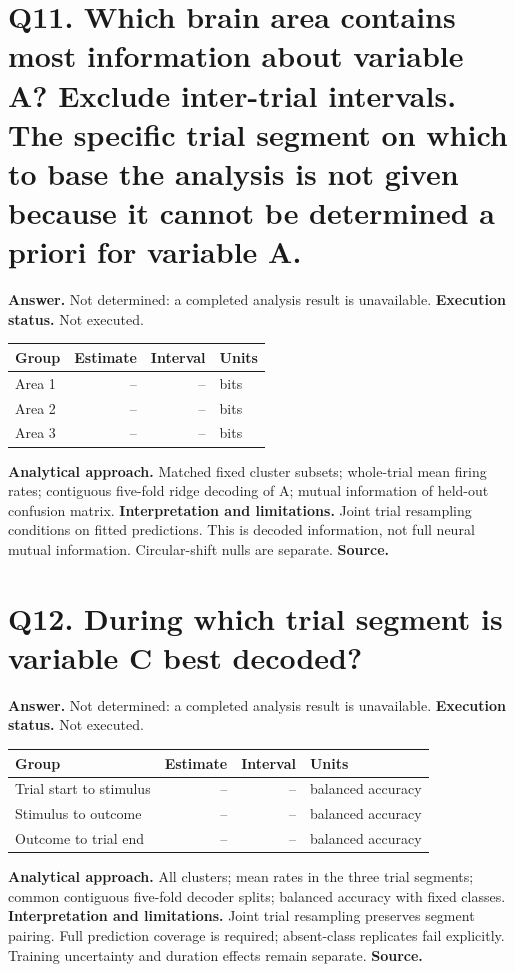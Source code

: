 \documentclass[11pt,a4paper]{article}
\begin{document}
\section*{Q11. Which brain area contains most information about variable A? Exclude inter-trial intervals. The specific trial segment on which to base the analysis is not given because it cannot be determined a priori for variable A.}
\textbf{Answer.} Not determined: a completed analysis result is unavailable.
\textbf{Execution status.} Not executed.
\begin{tabularx}{\linewidth}{XrrX}\toprule Group & Estimate & Interval & Units \\\midrule
Area 1 & -- & -- & bits \\
Area 2 & -- & -- & bits \\
Area 3 & -- & -- & bits \\
\bottomrule\end{tabularx}
\textbf{Analytical approach.} Matched fixed cluster subsets; whole-trial mean firing rates; contiguous five-fold ridge decoding of A; mutual information of held-out confusion matrix.
\textbf{Interpretation and limitations.} Joint trial resampling conditions on fitted predictions. This is decoded information, not full neural mutual information. Circular-shift nulls are separate.
\textbf{Source.} 
\clearpage
\section*{Q12. During which trial segment is variable C best decoded?}
\textbf{Answer.} Not determined: a completed analysis result is unavailable.
\textbf{Execution status.} Not executed.
\begin{tabularx}{\linewidth}{XrrX}\toprule Group & Estimate & Interval & Units \\\midrule
Trial start to stimulus & -- & -- & balanced accuracy \\
Stimulus to outcome & -- & -- & balanced accuracy \\
Outcome to trial end & -- & -- & balanced accuracy \\
\bottomrule\end{tabularx}
\textbf{Analytical approach.} All clusters; mean rates in the three trial segments; common contiguous five-fold decoder splits; balanced accuracy with fixed classes.
\textbf{Interpretation and limitations.} Joint trial resampling preserves segment pairing. Full prediction coverage is required; absent-class replicates fail explicitly. Training uncertainty and duration effects remain separate.
\textbf{Source.} 
\clearpage
\end{document}

